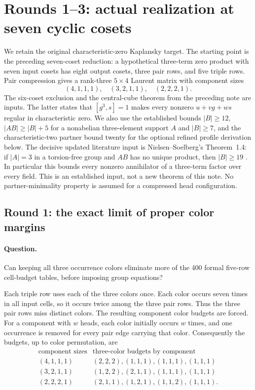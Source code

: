 \documentclass[11pt,a4paper,oneside]{report}
\theoremstyle{definition}
\theoremstyle{remark}
\begin{document}
\section{Rounds 1--3: actual realization at seven cyclic cosets}
\label{M13:nextcolor:section}

We retain the original characteristic-zero Kaplansky target. The
starting point is the preceding seven-coset reduction: a hypothetical
three-term zero product with seven input cosets has eight output
cosets, three pair rows, and five triple rows. Pair compression gives
a rank-three $5\times4$ Laurent matrix with component sizes
\[
 (4,1,1,1),\quad (3,2,1,1),\quad (2,2,2,1).
\]
The six-coset exclusion and the central-cube theorem from the preceding
note are inputs. The latter states that $[g^3,s]=1$ makes every
nonzero $u+vg+ws$ regular in characteristic zero. We also use the
established bounds $|B|\ge12$, $|AB|\ge|B|+5$ for a nonabelian
three-element support $A$ and $|B|\ge7$, and the characteristic-two
partner bound twenty \cite{B:AJ,B:ATsmall} for the optional refined profile
derivation below. The decisive updated literature input is
Nielsen--Soelberg's Theorem~1.4: if $|A|=3$ in a torsion-free group
and $AB$ has no unique product, then $|B|\ge19$ \cite{B:NS}.
In particular this bounds every nonzero annihilator of a three-term
factor over every field. This is an established input, not a new
theorem of this note. No partner-minimality property is assumed for
a compressed head configuration.

\subsection{Round 1: the exact limit of proper color margins}

\paragraph{Question.}
Can keeping all three occurrence colors eliminate more of the 400
formal five-row cell-budget tables, before imposing group equations?

Each triple row uses each of the three colors once. Each color occurs
seven times in all input cells, so it occurs twice among the three
pair rows. Thus the three pair rows miss distinct colors.
The resulting component color budgets are forced. For a component
with $w$ heads, each color initially occurs $w$ times, and one
occurrence is removed for every pair edge carrying that color.
Consequently the budgets, up to color permutation, are
\[
\begin{array}{c|c}
\text{component sizes}&\text{three-color budgets by component}\\
\hline
(4,1,1,1)&(2,2,2),(1,1,1),(1,1,1),(1,1,1)\\
(3,2,1,1)&(1,2,2),(2,1,1),(1,1,1),(1,1,1)\\
(2,2,2,1)&(2,1,1),(1,2,1),(1,1,2),(1,1,1).
\end{array}
\]
\end{document}
